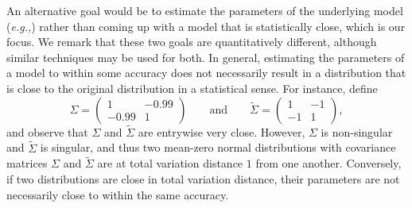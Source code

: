 \documentclass[letterpaper]{amsart}
\makeatletter
\newcommand*{\eg}{\emph{e.g.,}\@\xspace}
\numberwithin{thm}{section}
\theoremstyle{definition}
\theoremstyle{plain}
\renewcommand{\tilde}[1]{\widetilde{#1}}
\makeatother
\begin{document}
An alternative goal would be to estimate the parameters of the
underlying model (\eg \cite{KMV}) rather than coming up with a model
that is statistically close, which is our focus.  We remark that these
two goals are quantitatively different, although similar techniques
may be used for both. In general, estimating the parameters of a model
to within some accuracy does not necessarily result in a distribution
that is close to the original distribution in a statistical sense. For
instance, define
\[
  \Sigma = \begin{pmatrix} 1 & -0.99 \\ -0.99 & 1 \end{pmatrix}
  \qquad\text{and}\qquad
  \tilde{\Sigma} = \begin{pmatrix} 1 & -1 \\ -1 & 1 \end{pmatrix},
\]
and observe that $\Sigma$ and $\tilde{\Sigma}$ are entrywise very
close. However, $\Sigma$ is non-singular and $\tilde{\Sigma}$ is
singular, and thus two mean-zero normal distributions with covariance
matrices $\Sigma$ and $\tilde{\Sigma}$ are at total variation distance
$1$ from one another. Conversely, if two distributions are close in
total variation distance, their parameters are not necessarily close
to within the same accuracy.
\end{document}
